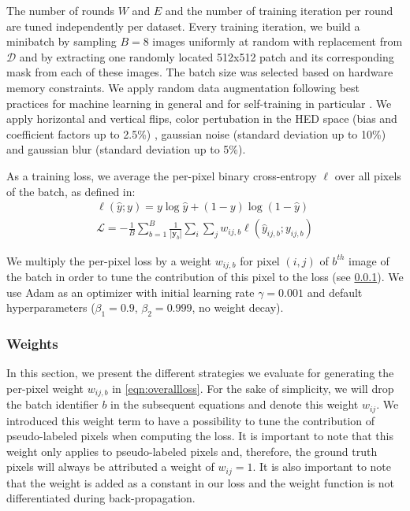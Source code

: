 The number of rounds $W$ and $E$ and the number of training iteration per round are tuned independently per dataset. Every training iteration, we build a minibatch by sampling $B=8$ images uniformly at random with replacement from $\mathcal{D}$ and by extracting one randomly located 512x512 patch and its corresponding mask from each of these images. The batch size was selected based on hardware memory constraints. We apply random data augmentation following best practices for machine learning in general and for self-training in particular \cite{xie2020self, sohn2020fixmatch}. We apply horizontal and vertical flips, color pertubation in the HED space \cite{tellez2018whole} (bias and coefficient factors up to 2.5\%) , gaussian noise (standard deviation up to 10\%) and gaussian blur (standard deviation up to 5\%). 

As a training loss, we average the per-pixel binary cross-entropy $\ell$ over all pixels of the batch, as defined in:
\begin{align}
\ell(\hat{y}; y) = y \log \hat{y} + (1 - y) \log (1 - \hat{y}) \label{eqn:perpixel_crossentropy} \\
\mathcal{L} = - \frac{1}{B} \sum_{b=1}^B \frac{1}{|\mathbf{y}_b|}\sum_{i}\sum_{j} w_{ij, b} \ell(\hat{y}_{ij, b}; y_{ij,b }) 
\label{eqn:overallloss}
\end{align}

We multiply the per-pixel loss by a weight $w_{ij, b}$ for pixel $(i, j)$ of $b^{th}$ image of the batch in order to tune the contribution of this pixel to the loss (see \cref{sssec:weights}). We use Adam \cite{kingma2014adam} as an optimizer with initial learning rate $\gamma= 0.001$ and default hyperparameters ($\beta_1 = 0.9$, $\beta_2 = 0.999$, no weight decay).


\subsubsection{Weights}
\label{sssec:weights}
In this section, we present the different strategies we evaluate for generating the per-pixel weight $w_{ij,b}$ in \cref{eqn:overallloss}. For the sake of simplicity, we will drop the batch identifier $b$ in the subsequent equations and denote this weight $w_{ij}$. We introduced this weight term to have a possibility to tune the contribution of pseudo-labeled pixels when computing the loss. It is important to note that this weight only applies to pseudo-labeled pixels and, therefore, the ground truth pixels will always be attributed a weight of $w_{ij} = 1$. It is also important to note that the weight is added as a constant in our loss and the weight function is not differentiated during back-propagation. 

